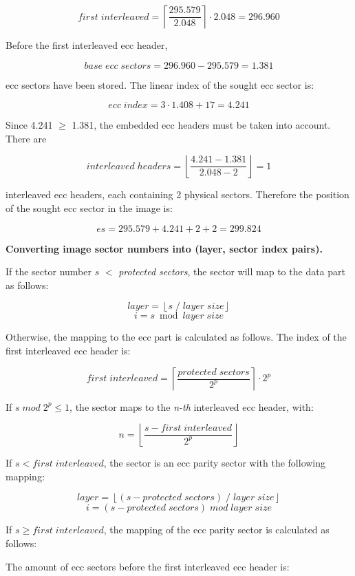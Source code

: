 \[ first\; interleaved = \left\lceil\frac{295.579}{2.048}\right\rceil \cdot 2.048 = 296.960 \]

Before the first interleaved ecc header,

\[ base\; ecc\; sectors = 296.960 - 295.579 = 1.381 \]

ecc sectors have been stored. The linear index of the sought ecc sector is:

\[ ecc\; index = 3 \cdot 1.408 + 17 = 4.241 \]

Since 4.241 $\ge$ 1.381, the embedded ecc headers must be taken into account. There are

\[ interleaved \; headers = \left\lfloor\frac{4.241 - 1.381}{2.048-2}\right\rfloor = 1 \]

interleaved ecc headers, each containing 2 physical sectors. Therefore the position
of the sought ecc sector in the image is:

\[ es = 295.579 + 4.241 + 2 + 2 = 299.824 \]

\bigskip

{\bf Converting image sector numbers into (layer, sector index pairs).}

\smallskip

If the sector number $s$ $<$ {\em protected sectors}, the sector will map to the data part
as follows:

\[layer = \left\lfloor s\; /\; layer\;size \right\rfloor\]
\[i = s \bmod layer\;size\]

Otherwise, the mapping to the ecc part is calculated as follows. The index of the first interleaved ecc header is:

\[ first\; interleaved = \left\lceil\frac{protected\; sectors}{2^p}\right\rceil \cdot 2^p\]

If $s\; mod\; 2^p \le 1$, the sector maps to the {\em n-th} interleaved ecc header, with:

\[n = \left\lfloor\frac{s - first\; interleaved}{2^p}\right\rfloor\] 

If $s < first\; interleaved$, the sector is an ecc parity sector with the following mapping:

\[ layer = \left\lfloor(s - protected\; sectors)\; /\; layer\; size\right\rfloor\]
\[ i = (s - protected\; sectors)\; mod\; layer\;size\]

If $s \ge first\; interleaved$, the mapping of the ecc parity sector is calculated as follows:

The amount of ecc sectors before the first interleaved ecc header is:

